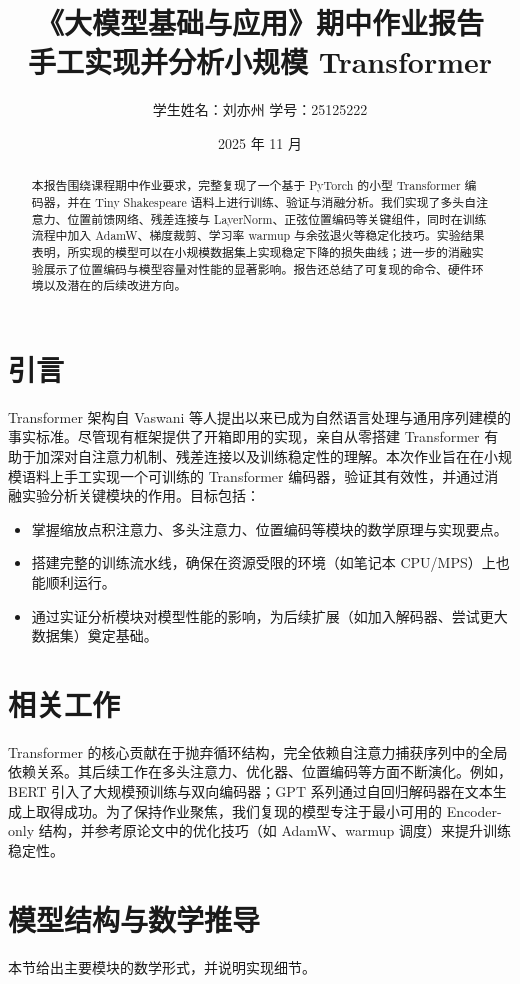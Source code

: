 \documentclass[12pt,a4paper]{article}
\title{\textbf{《大模型基础与应用》期中作业报告}\\
\large 手工实现并分析小规模 Transformer}
\author{学生姓名：刘亦州 \quad 学号：25125222}
\date{2025 年 11 月}
\begin{document}
\maketitle

\begin{abstract}
本报告围绕课程期中作业要求，完整复现了一个基于 PyTorch 的小型 Transformer 编码器，并在 Tiny Shakespeare 语料上进行训练、验证与消融分析。我们实现了多头自注意力、位置前馈网络、残差连接与 LayerNorm、正弦位置编码等关键组件，同时在训练流程中加入 AdamW、梯度裁剪、学习率 warmup 与余弦退火等稳定化技巧。实验结果表明，所实现的模型可以在小规模数据集上实现稳定下降的损失曲线；进一步的消融实验展示了位置编码与模型容量对性能的显著影响。报告还总结了可复现的命令、硬件环境以及潜在的后续改进方向。
\end{abstract}

\section{引言}
Transformer 架构自 Vaswani 等人提出以来已成为自然语言处理与通用序列建模的事实标准\cite{vaswani2017attention}。尽管现有框架提供了开箱即用的实现，亲自从零搭建 Transformer 有助于加深对自注意力机制、残差连接以及训练稳定性的理解。本次作业旨在在小规模语料上手工实现一个可训练的 Transformer 编码器，验证其有效性，并通过消融实验分析关键模块的作用。目标包括：
\begin{itemize}
    \item 掌握缩放点积注意力、多头注意力、位置编码等模块的数学原理与实现要点。
    \item 搭建完整的训练流水线，确保在资源受限的环境（如笔记本 CPU/MPS）上也能顺利运行。
    \item 通过实证分析模块对模型性能的影响，为后续扩展（如加入解码器、尝试更大数据集）奠定基础。
\end{itemize}

\section{相关工作}
Transformer 的核心贡献在于抛弃循环结构，完全依赖自注意力捕获序列中的全局依赖关系\cite{vaswani2017attention}。其后续工作在多头注意力、优化器、位置编码等方面不断演化。例如，BERT 引入了大规模预训练与双向编码器；GPT 系列通过自回归解码器在文本生成上取得成功。为了保持作业聚焦，我们复现的模型专注于最小可用的 Encoder-only 结构，并参考原论文中的优化技巧（如 AdamW、warmup 调度）来提升训练稳定性。

\section{模型结构与数学推导}
本节给出主要模块的数学形式，并说明实现细节。
\end{document}
